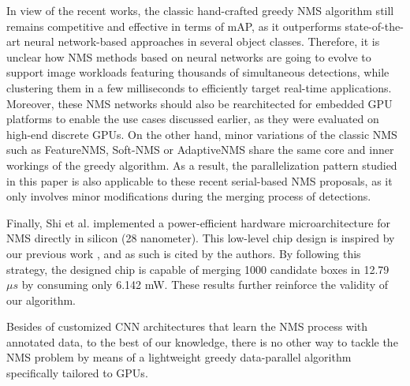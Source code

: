 In view of the recent works, the classic hand-crafted greedy NMS algorithm still remains competitive and effective in terms of mAP, as it outperforms state-of-the-art neural network-based 
approaches in several object classes. Therefore, it is unclear how NMS methods based on neural networks are going to evolve to support image workloads featuring thousands of 
simultaneous detections, while clustering them in a few milliseconds to efficiently target real-time applications. Moreover, these NMS networks should also be rearchitected for embedded 
GPU platforms to enable the use cases discussed earlier, as they were evaluated on high-end discrete GPUs. On the other hand, minor variations of the classic NMS such 
as FeatureNMS, Soft-NMS or AdaptiveNMS share the same core and inner workings of the greedy algorithm. As a result, the parallelization pattern studied in this paper is also 
applicable to these recent serial-based NMS proposals, as it only involves minor modifications during the merging process of detections.

Finally, Shi et al.\cite{shi2019fast} implemented a power-efficient hardware microarchitecture for NMS directly in silicon (28 nanometer). This low-level chip design is inspired by 
our previous work \cite{oro2016work}, and as such is cited by the authors. By following this strategy, the designed chip is capable of merging 1000 candidate boxes in 12.79 $\mu s$ by consuming only 6.142 mW. These results further reinforce the validity of our algorithm. 

Besides of customized CNN architectures that learn the NMS process with annotated data, to the best of our knowledge, there is no other way to tackle the NMS problem by means of a 
lightweight greedy data-parallel algorithm specifically tailored to GPUs.